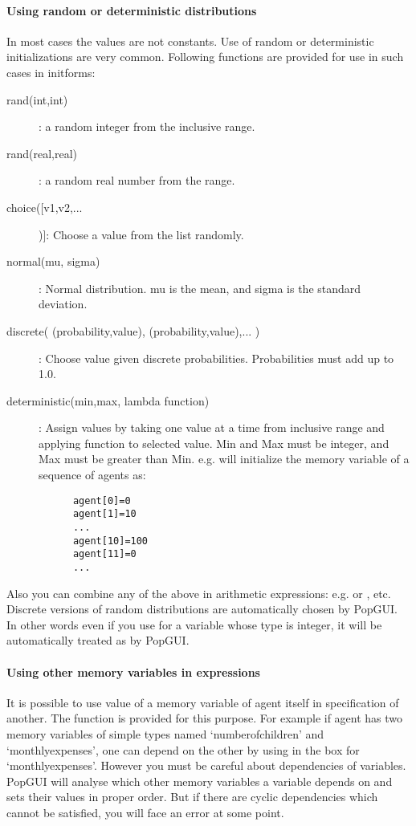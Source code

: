 \documentclass[10pt]{article}
\begin{document}
\paragraph{Using random or deterministic distributions}
In most cases the values are not constants. Use of random or deterministic initializations are very common. Following functions are provided for use in such cases in initforms:
\begin{description}  
   \item[rand(int,int)]: a random integer from the inclusive range.
   \item[rand(real,real)]: a random real number from the range.
   \item[choice([v1,v2,...])]: Choose a value from the list randomly.
   \item[normal(mu, sigma)]: Normal distribution. mu is the mean, and sigma is the standard deviation. 
   \item[discrete( (probability,value), (probability,value),... )]: Choose value given discrete probabilities. Probabilities must add up to 1.0.
   \item[deterministic(min,max, lambda function)]:  Assign values by taking one value at a time from inclusive range and applying function to selected value. Min and Max must be integer, and Max must be greater than Min. e.g.  will initialize the memory variable of a sequence of agents as:
     \begin{verbatim}
      agent[0]=0
      agent[1]=10
      ...
      agent[10]=100
      agent[11]=0
      ...
     \end{verbatim}
\end{description}
Also you can combine any of the above in arithmetic expressions: e.g.  or , etc. Discrete versions of random distributions are automatically chosen by PopGUI. In other words even if you use  for a variable whose type is integer, it will be automatically treated as   by PopGUI.

\paragraph{Using other memory variables in expressions}
It is possible to use value of a memory variable of agent itself in specification of another. The  function is provided for this purpose. For example if agent has two memory variables of simple types named `numberofchildren' and `monthlyexpenses', one can depend on the other by using  in the box for `monthlyexpenses'. However you must be careful about dependencies of variables. PopGUI will analyse which other memory variables a variable depends on and sets their values in proper order. But if there are cyclic dependencies which cannot be satisfied, you will face an error at some point.
\end{document}
